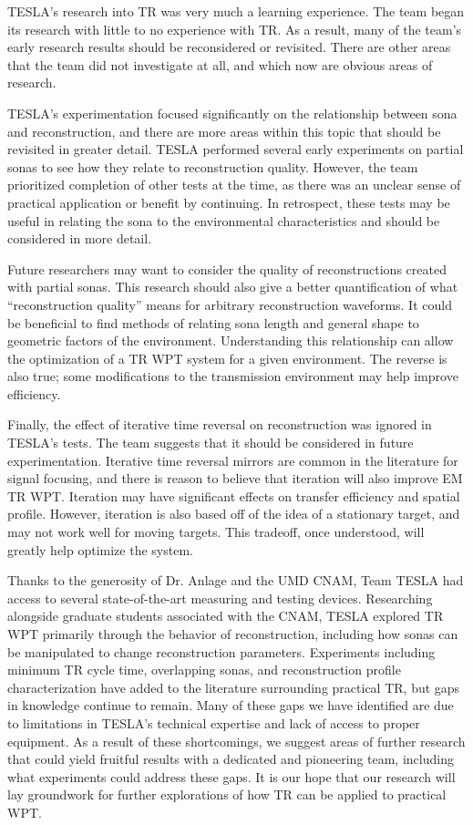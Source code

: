 TESLA's research into TR was very much a learning experience.  The team began its research with little to no experience with TR.  As a result, many of the team's early research results should be reconsidered or revisited. There are other areas that the team did not investigate at all, and which now are obvious areas of research.

TESLA's experimentation focused significantly on the relationship between sona and reconstruction, and there are more areas within this topic that should be revisited in greater detail.  TESLA performed several early experiments on partial sonas to see how they relate to reconstruction quality.  However, the team prioritized completion of other tests at the time, as there was an unclear sense of practical application or benefit by continuing.  In retrospect, these tests may be useful in relating the sona to the environmental characteristics and should be considered in more detail.

Future researchers may want to consider the quality of reconstructions created with partial sonas.  This research should also give a better quantification of what ``reconstruction quality'' means for arbitrary reconstruction waveforms. It could be beneficial to find methods of relating sona length and general shape to geometric factors of the environment. Understanding this relationship can allow the optimization of a TR WPT system for a given environment. The reverse is also true; some modifications to the transmission environment may help improve efficiency.

Finally, the effect of iterative time reversal on reconstruction was ignored in TESLA's tests.  The team suggests that it should be considered in future experimentation. Iterative time reversal mirrors are common in the literature for signal focusing, and there is reason to believe that iteration will also improve EM TR WPT.  Iteration may have significant effects on transfer efficiency and spatial profile.  However, iteration is also based off of the idea of a stationary target, and may not work well for moving targets.  This tradeoff, once understood, will greatly help optimize the system.

Thanks to the generosity of Dr. Anlage and the UMD CNAM, Team TESLA had access to several state-of-the-art measuring and testing devices. Researching alongside graduate students associated with the CNAM, TESLA explored TR WPT primarily through the behavior of reconstruction, including how sonas can be manipulated to change reconstruction parameters.  Experiments including minimum TR cycle time, overlapping sonas, and reconstruction profile characterization have added to the literature surrounding practical TR, but gaps in knowledge continue to remain.  Many of these gaps we have identified are due to limitations in TESLA's technical expertise and lack of  access to proper equipment.  As a result of these shortcomings, we suggest areas of further research that could yield fruitful results with a dedicated and pioneering team, including what experiments could address these gaps.  It is our hope that our research will lay groundwork for further explorations of how TR can be applied to practical WPT.
